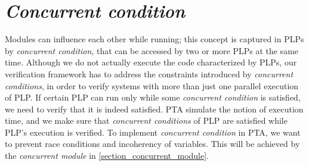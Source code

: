 \section{\textit{Concurrent condition} \label{plp_to_pta_concurrent_condition}}
Modules can influence each other while running; this concept is captured in PLPs by \textit{concurrent condition}, that can be accessed by two or more PLPs at the same time. Although we do not actually execute the code characterized by PLPs, our verification framework has to address the constraints introduced by \textit{concurrent conditions}, in order to verify systems with more than just one parallel execution of PLP. If certain PLP can run only while some \textit{concurrent condition} is satisfied, we need to verify that it is indeed satisfied. PTA simulate the notion of execution time, and we make sure that \textit{concurrent conditions} of PLP are satisfied while PLP’s execution is verified. To implement \textit{concurrent condition} in PTA, we want to prevent race conditions and incoherency of variables. This will be achieved by the \textit{concurrent module} in \ref{section_concurrent_module}. \\
